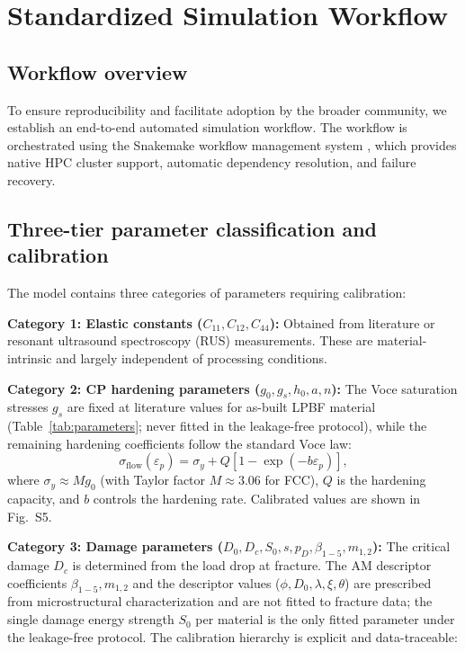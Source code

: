 \section{Standardized Simulation Workflow}
\label{sec:workflow}

\subsection{Workflow overview}

To ensure reproducibility and facilitate adoption by the broader community, we establish an end-to-end automated simulation workflow. The workflow is orchestrated using the Snakemake workflow management system \cite{koster2012snakemake}, which provides native HPC cluster support, automatic dependency resolution, and failure recovery.
\subsection{Three-tier parameter classification and calibration}
\label{sec:calibration}

The model contains three categories of parameters requiring calibration:

\textbf{Category 1: Elastic constants ($C_{11}, C_{12}, C_{44}$):} Obtained from literature or resonant ultrasound spectroscopy (RUS) measurements. These are material-intrinsic and largely independent of processing conditions.

\textbf{Category 2: CP hardening parameters ($g_0, g_s, h_0, a, n$):} The Voce saturation stresses $g_s$ are fixed at literature values for as-built LPBF material (Table~\ref{tab:parameters}; never fitted in the leakage-free protocol), while the remaining hardening coefficients follow the standard Voce law:
\begin{equation}
\sigma_{\mathrm{flow}}(\varepsilon_p) = \sigma_y + Q \left[1 - \exp(-b\varepsilon_p)\right],
\label{eq:voce_flow}
\end{equation}
where $\sigma_y \approx M g_0$ (with Taylor factor $M \approx 3.06$ for FCC), $Q$ is the hardening capacity, and $b$ controls the hardening rate. Calibrated values are shown in Fig.~S5.

\textbf{Category 3: Damage parameters ($D_0, D_c, S_0, s, p_D, \beta_{1-5}, m_{1,2}$):} The critical damage $D_c$ is determined from the load drop at fracture. The AM descriptor coefficients $\beta_{1-5}, m_{1,2}$ and the descriptor values ($\phi, D_0, \lambda, \xi, \theta$) are prescribed from microstructural characterization and are not fitted to fracture data; the single damage energy strength $S_0$ per material is the only fitted parameter under the leakage-free protocol. The calibration hierarchy is explicit and data-traceable:

